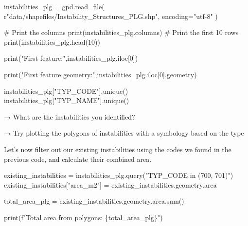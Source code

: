 \documentclass[
  letterpaper,
  DIV=11,
  numbers=noendperiod]{scrartcl}
\newenvironment{Shaded}{\begin{snugshade}}{\end{snugshade}}
\newcommand{\BuiltInTok}[1]{\textcolor[rgb]{0.00,0.23,0.31}{#1}}
\newcommand{\CommentTok}[1]{\textcolor[rgb]{0.37,0.37,0.37}{#1}}
\newcommand{\DecValTok}[1]{\textcolor[rgb]{0.68,0.00,0.00}{#1}}
\newcommand{\NormalTok}[1]{\textcolor[rgb]{0.00,0.23,0.31}{#1}}
\newcommand{\OperatorTok}[1]{\textcolor[rgb]{0.37,0.37,0.37}{#1}}
\newcommand{\SpecialCharTok}[1]{\textcolor[rgb]{0.37,0.37,0.37}{#1}}
\newcommand{\SpecialStringTok}[1]{\textcolor[rgb]{0.13,0.47,0.30}{#1}}
\newcommand{\StringTok}[1]{\textcolor[rgb]{0.13,0.47,0.30}{#1}}
\newcommand{\VerbatimStringTok}[1]{\textcolor[rgb]{0.13,0.47,0.30}{#1}}
\begin{document}
\begin{Shaded}
\begin{Highlighting}[]
\NormalTok{instabilities\_plg }\OperatorTok{=}\NormalTok{ gpd.read\_file(}
    \VerbatimStringTok{r"data/shapefiles/Instability\_Structures\_PLG}\DecValTok{.}\VerbatimStringTok{shp"}\NormalTok{,}
\NormalTok{    encoding}\OperatorTok{=}\StringTok{"utf{-}8"}
\NormalTok{)}

\CommentTok{\# Print the columns}
\BuiltInTok{print}\NormalTok{(instabilities\_plg.columns)}
\CommentTok{\# Print the first 10 rows}
\BuiltInTok{print}\NormalTok{(instabilities\_plg.head(}\DecValTok{10}\NormalTok{))}

\BuiltInTok{print}\NormalTok{(}\StringTok{"First feature:"}\NormalTok{,instabilities\_plg.iloc[}\DecValTok{0}\NormalTok{])}

\BuiltInTok{print}\NormalTok{(}\StringTok{"First feature geometry:"}\NormalTok{,instabilities\_plg.iloc[}\DecValTok{0}\NormalTok{].geometry)}

\NormalTok{instabilities\_plg[}\StringTok{"TYP\_CODE"}\NormalTok{].unique()}
\NormalTok{instabilities\_plg[}\StringTok{"TYP\_NAME"}\NormalTok{].unique()}
\end{Highlighting}
\end{Shaded}

→ What are the instabilities you identified?

→ Try plotting the polygons of instabilities with a symbology based on
the type

Let's now filter out our existing instabilities using the codes we found
in the previous code, and calculate their combined area.

\begin{Shaded}
\begin{Highlighting}[]
\NormalTok{existing\_instabilities }\OperatorTok{=}\NormalTok{ instabilities\_plg.query(}\StringTok{"TYP\_CODE in (\textquotesingle{}700\textquotesingle{}, \textquotesingle{}701\textquotesingle{})"}\NormalTok{)}
\NormalTok{existing\_instabilities[}\StringTok{"area\_m2"}\NormalTok{] }\OperatorTok{=}\NormalTok{ existing\_instabilities.geometry.area}

\NormalTok{total\_area\_plg }\OperatorTok{=}\NormalTok{ existing\_instabilities.geometry.area.}\BuiltInTok{sum}\NormalTok{()}

\BuiltInTok{print}\NormalTok{(}\SpecialStringTok{f"Total area from polygons: }\SpecialCharTok{\{}\NormalTok{total\_area\_plg}\SpecialCharTok{\}}\SpecialStringTok{"}\NormalTok{)}
\end{Highlighting}
\end{Shaded}
\end{document}
